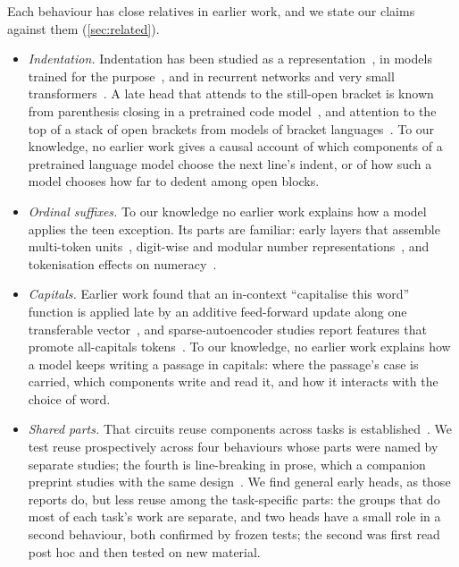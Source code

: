 \documentclass[11pt]{article}
\begin{document}
Each behaviour has close relatives in earlier work, and we state our claims against them (\cref{sec:related}).
\begin{itemize}
\item \emph{Indentation.} Indentation has been studied as a representation~\citep{bassi2026geometry}, in models trained for the purpose~\citep{gao2025weightsparse}, and in recurrent networks and very small transformers~\citep{karpathy2015visualizing,janiak2023polysemantic}. A late head that attends to the still-open bracket is known from parenthesis closing in a pretrained code model~\citep{rai2025interference}, and attention to the top of a stack of open brackets from models of bracket languages~\citep{ebrahimi2020dyck,yao2021bounded,sharma2026dyck}. To our knowledge, no earlier work gives a causal account of which components of a pretrained language model choose the next line's indent, or of how such a model chooses how far to dedent among open blocks.
\item \emph{Ordinal suffixes.} To our knowledge no earlier work explains how a model applies the teen exception. Its parts are familiar: early layers that assemble multi-token units~\citep{feucht2024erasure,lad2024stages}, digit-wise and modular number representations~\citep{levy2025digits,gould2024successor,baeumel2025modular}, and tokenisation effects on numeracy~\citep{singh2024tokenization}.
\item \emph{Capitals.} Earlier work found that an in-context ``capitalise this word'' function is applied late by an additive feed-forward update along one transferable vector~\citep{merullo2024word2vec}, and sparse-autoencoder studies report features that promote all-capitals tokens~\citep{bloom2024saelogitlens}. To our knowledge, no earlier work explains how a model keeps writing a passage in capitals: where the passage's case is carried, which components write and read it, and how it interacts with the choice of word.
\item \emph{Shared parts.} That circuits reuse components across tasks is established~\citep{merullo2024reuse,lan2024sequence,li2026circuits}. We test reuse prospectively across four behaviours whose parts were named by separate studies; the fourth is line-breaking in prose, which a companion preprint studies with the same design~\citep{jeevash2026linebreaking}. We find general early heads, as those reports do, but less reuse among the task-specific parts: the groups that do most of each task's work are separate, and two heads have a small role in a second behaviour, both confirmed by frozen tests; the second was first read post hoc and then tested on new material.
\end{itemize}
\end{document}
